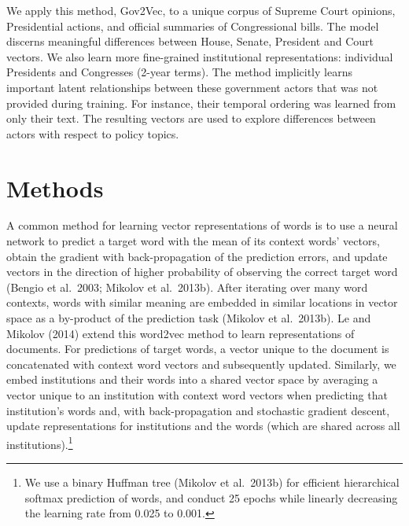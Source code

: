 \documentclass[11pt,letterpaper]{article}
\begin{document}
We apply this method, Gov2Vec, to a unique corpus of Supreme Court opinions, Presidential
actions, and official summaries of Congressional bills. The model discerns meaningful differences between House, Senate, President and Court vectors. We also learn more fine-grained institutional representations: individual Presidents and Congresses (2-year terms). 
The method implicitly learns important latent relationships between these government actors that was not provided during training. For instance, their temporal ordering was learned from only their text. The resulting vectors are used to explore differences between actors with respect to policy topics.

\section{Methods}\label{methods}

A common method for learning vector representations of words is to use a neural network to predict a target word with the mean of its context words' vectors, obtain the gradient with back-propagation of the prediction errors, and update vectors in the direction of higher probability of observing the correct target word (Bengio et al.~2003; Mikolov et al.~2013b). After iterating over many word contexts, words with similar meaning are embedded in similar locations in vector space as a by-product of the prediction task (Mikolov et al.~2013b). Le and Mikolov (2014) extend this word2vec method to learn representations of documents. For predictions of target words, a vector unique to the document is concatenated with context word vectors and subsequently updated. Similarly, we embed institutions and their words into a shared vector space by averaging a vector unique to an institution with context word vectors when predicting that institution's words and, with back-propagation and stochastic gradient descent, update representations for institutions and the words (which are shared across all institutions).\footnote{We use a binary Huffman tree (Mikolov et al.~2013b) for efficient hierarchical softmax prediction of words, and conduct 25 epochs while linearly decreasing the learning rate from 0.025 to 0.001.}
\end{document}
